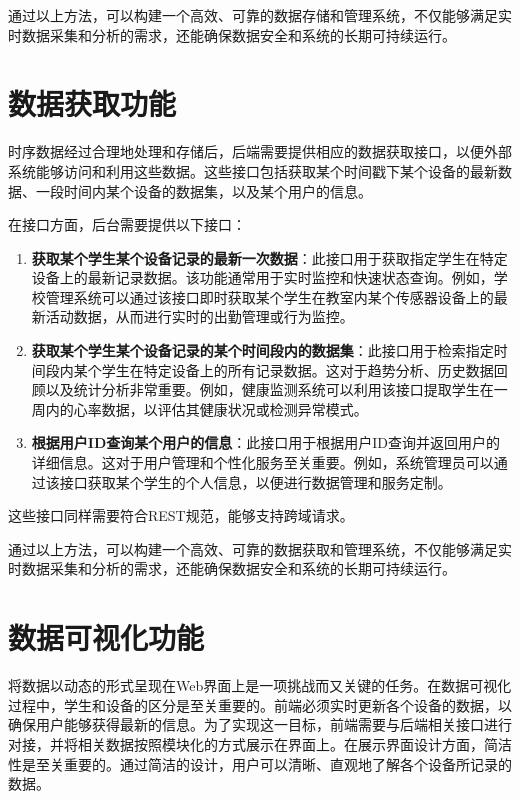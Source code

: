 \documentclass[oneside]{xduugthesis}
\begin{document}
通过以上方法，可以构建一个高效、可靠的数据存储和管理系统，不仅能够满足实时数据采集和分析的需求，还能确保数据安全和系统的长期可持续运行。

\section{数据获取功能}

时序数据经过合理地处理和存储后，后端需要提供相应的数据获取接口，以便外部系统能够访问和利用这些数据。这些接口包括获取某个时间戳下某个设备的最新数据、一段时间内某个设备的数据集，以及某个用户的信息。

在接口方面，后台需要提供以下接口：

\begin{enumerate}[nosep]
    \item \textbf{获取某个学生某个设备记录的最新一次数据}：此接口用于获取指定学生在特定设备上的最新记录数据。该功能通常用于实时监控和快速状态查询。例如，学校管理系统可以通过该接口即时获取某个学生在教室内某个传感器设备上的最新活动数据，从而进行实时的出勤管理或行为监控。
    
    \item \textbf{获取某个学生某个设备记录的某个时间段内的数据集}：此接口用于检索指定时间段内某个学生在特定设备上的所有记录数据。这对于趋势分析、历史数据回顾以及统计分析非常重要。例如，健康监测系统可以利用该接口提取学生在一周内的心率数据，以评估其健康状况或检测异常模式。
    
    \item \textbf{根据用户ID查询某个用户的信息}：此接口用于根据用户ID查询并返回用户的详细信息。这对于用户管理和个性化服务至关重要。例如，系统管理员可以通过该接口获取某个学生的个人信息，以便进行数据管理和服务定制。
\end{enumerate}

这些接口同样需要符合REST规范，能够支持跨域请求。

通过以上方法，可以构建一个高效、可靠的数据获取和管理系统，不仅能够满足实时数据采集和分析的需求，还能确保数据安全和系统的长期可持续运行。

\section{数据可视化功能}

将数据以动态的形式呈现在Web界面上是一项挑战而又关键的任务。在数据可视化过程中，学生和设备的区分是至关重要的。前端必须实时更新各个设备的数据，以确保用户能够获得最新的信息。为了实现这一目标，前端需要与后端相关接口进行对接，并将相关数据按照模块化的方式展示在界面上。在展示界面设计方面，简洁性是至关重要的。通过简洁的设计，用户可以清晰、直观地了解各个设备所记录的数据。
\end{document}
